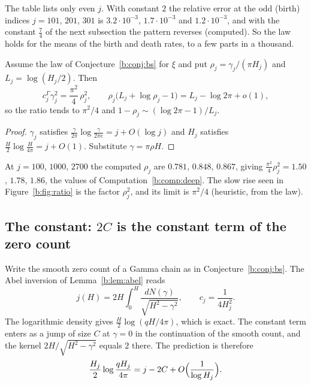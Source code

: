 The table lists only even $j$. With constant $2$ the relative error at the odd (birth) indices $j=101$, $201$, $301$ is $3.2\cdot10^{-3}$, $1.7\cdot10^{-3}$ and $1.2\cdot10^{-3}$, and with the constant $\frac74$ of the next subsection the pattern reverses (computed). So the law holds for the means of the birth and death rates, to a few parts in a thousand.

\begin{corollary}\label{b:cor:limit}
Assume the law of Conjecture~\ref{b:conj:bs} for $\xi$ and put $\rho_j=\gamma_j/(\pi H_j)$ and $L_j=\log(H_j/2)$. Then
\[
c_j^\Gamma\gamma_j^2=\frac{\pi^2}{4}\,\rho_j^2,\qquad
\rho_j\bigl(L_j+\log\rho_j-1\bigr)=L_j-\log2\pi+o(1),
\]
so the ratio tends to $\pi^2/4$ and $1-\rho_j\sim(\log2\pi-1)/L_j$.
\end{corollary}
\begin{proof}
$\gamma_j$ satisfies $\frac{\gamma}{2\pi}\log\frac{\gamma}{2\pi e}=j+O(\log j)$ and $H_j$ satisfies $\frac H2\log\frac H{4\pi}=j+O(1)$. Substitute $\gamma=\pi\rho H$.
\end{proof}

At $j=100$, $1000$, $2700$ the computed $\rho_j$ are $0.781$, $0.848$, $0.867$, giving $\frac{\pi^2}{4}\rho_j^2=1.50$, $1.78$, $1.86$, the values of Computation~\ref{b:comp:deep}. The slow rise seen in Figure~\ref{b:fig:ratio} is the factor $\rho_j^2$, and its limit is $\pi^2/4$ (heuristic, from the law). %

\subsection{The constant: $2C$ is the constant term of the zero count}\label{b:sec:c0}

Write the smooth zero count of a Gamma chain as in Conjecture~\ref{b:conj:bs}. The Abel inversion of Lemma~\ref{b:lem:abel} reads
\begin{equation}\label{b:eq:abelj}
j(H)=2H\int_0^H\frac{dN(\gamma)}{\sqrt{H^2-\gamma^2}},\qquad c_j=\frac{1}{4H_j^2}.
\end{equation}
The logarithmic density gives $\frac H2\log(qH/4\pi)$, which is exact. The constant term enters as a jump of size $C$ at $\gamma=0$ in the continuation of the smooth count, and the kernel $2H/\sqrt{H^2-\gamma^2}$ equals $2$ there. The prediction is therefore
\begin{equation}\label{b:eq:c0}
\frac{H_j}2\log\frac{qH_j}{4\pi}=j-2C+O\Bigl(\frac{1}{\log H_j}\Bigr).
\end{equation}

